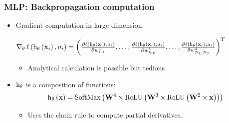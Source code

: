 \begin{frame}
  \frametitle{\acl{MLP}: Backpropagation computation}
  \begin{itemize}
    \item Gradient computation in large dimension:

    $
    \operatorname{\nabla}_{\mathbf{\theta}} \mathrm{\ell} \left ( {\mathrm{h}_{\mathbf{\theta}} \left ( {\mathbf{x}_i} \right ), u_i} \right ) =
    \left( \frac{\partial \mathrm{\ell} \left ( {\mathrm{h}_{\mathbf{\theta}} \left ( {\mathbf{x}_i} \right ), u_i} \right ) }{\partial w_{1,1}^1},\ldots,\frac{\partial \mathrm{\ell} \left ( {\mathrm{h}_{\mathbf{\theta}} \left ( {\mathbf{x}_i} \right ), u_i} \right ) }{\partial w_{k,p}^l},\ldots,\frac{\partial \mathrm{\ell} \left ( {\mathrm{h}_{\mathbf{\theta}} \left ( {\mathbf{x}_i} \right ), u_i} \right ) }{\partial w_{N_{4},N_{3}}^{4}} \right)^T
    $

    \begin{itemize}
    \item Analytical calculation is possible but tedious
    \end{itemize}
  \item $\mathrm{h}_{\mathbf{\theta}}$ is a
      composition of functions:
      \[
        \apply{\decisionFunc_{\params}}{\example} = \apply{\softMaxFunc}{%
          \weightMatrix^4 \times
          \apply{\ReLUFunc}{%
            \weightMatrix^3 \times
            \apply{\ReLUFunc}{%
              \weightMatrix^2 \times \example
            }
          }
        }
      \]
      \begin{itemize}
      \item Uses the chain rule to compute partial derivatives.
      \end{itemize}
  \end{itemize}

\end{frame}

